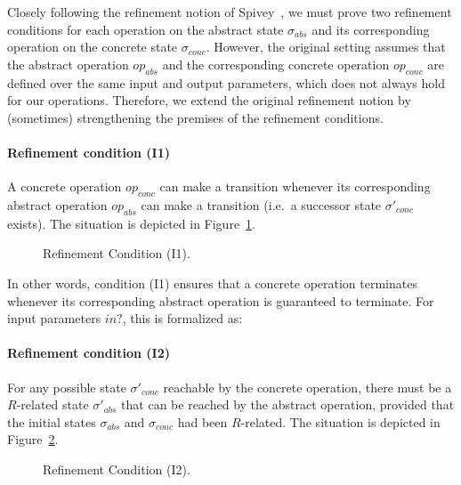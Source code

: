 Closely following the refinement notion of Spivey~\cite{spivey:z_notation:1992},
we must prove two refinement conditions for each operation on the abstract state
$\sigma_{abs}$ and its corresponding operation on the concrete state
$\sigma_{conc}$.  However, the original setting assumes that the abstract
operation $op_{abs}$ and the corresponding concrete operation $op_{conc}$ are
defined over the same input and output parameters, which does not always hold
for our operations.  Therefore, we extend the original refinement notion by
(sometimes) strengthening the premises of the refinement conditions.

\paragraph{Refinement condition (I1)}
A concrete operation $op_{conc}$ can make a transition whenever its
corresponding abstract operation $op_{abs}$ can make a transition (i.e.\ a
successor state $\sigma'_{conc}$ exists). The situation is depicted in
Figure~\ref{fig:refcon1}.
\begin{figure}[h!]
    \center
      \scalebox{0.5}{}
    \caption{Refinement Condition (I1).\label{fig:refcon1}}
\end{figure}

In other words, condition (I1) ensures that a concrete operation terminates
whenever its corresponding abstract operation is guaranteed to terminate. For
input parameters $in?$, this is formalized as:


\paragraph{Refinement condition (I2)}
For any possible state $\sigma'_{conc}$ reachable by the concrete operation,
there must be a $R$-related state $\sigma'_{abs}$ that can be reached by the
abstract operation, provided that the initial states $\sigma_{abs}$ and
$\sigma_{conc}$ had been $R$-related. The situation is depicted in
Figure~\ref{fig:refcon2}.
\begin{figure}[h!]
    \center
      \scalebox{0.5}{}
    \caption{Refinement Condition (I2).\label{fig:refcon2}}
\end{figure}

